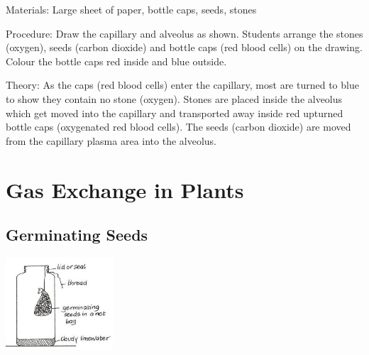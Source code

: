 \begin{multicols}{2}
\begin{description*}
\item[Materials:]{Large sheet of paper, bottle caps, seeds, stones}
\item[Procedure:]{Draw the capillary and alveolus as
shown. Students arrange the
stones (oxygen), seeds (carbon
dioxide) and bottle caps (red
blood cells) on the drawing. Colour the bottle caps red inside and blue outside.}
\item[Theory:]{As the caps (red blood cells) enter the capillary, most are turned to blue to show they contain no stone (oxygen). Stones are placed inside the alveolus which get moved into the capillary and transported away inside red upturned bottle caps (oxygenated red blood cells). The seeds (carbon dioxide) are moved from the capillary plasma area into the alveolus.}
\end{description*}


\section*{Gas Exchange in Plants}  


\subsection{Germinating Seeds}  %

\begin{center}
\includegraphics[width=0.3\textwidth]{./img/vso/respiration-co2.jpg}
\end{center}


\end{multicols}
